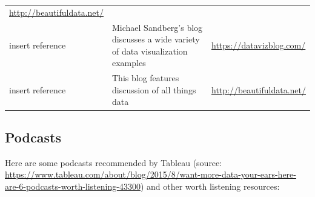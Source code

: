 \documentclass[]{book}
\begin{document}
\begin{longtable}[]{@{}lll@{}}
\begin{minipage}[t]{0.07\columnwidth}
\url{http://beautifuldata.net/}\strut
\end{minipage}\tabularnewline
\begin{minipage}[t]{0.07\columnwidth}\raggedright
insert reference\strut
\end{minipage} & \begin{minipage}[t]{0.77\columnwidth}\raggedright
Michael Sandberg's blog discusses a wide variety of data visualization examples\strut
\end{minipage} & \begin{minipage}[t]{0.07\columnwidth}\raggedright
\url{https://datavizblog.com/}\strut
\end{minipage}\tabularnewline
\begin{minipage}[t]{0.07\columnwidth}\raggedright
insert reference\strut
\end{minipage} & \begin{minipage}[t]{0.77\columnwidth}\raggedright
This blog features discussion of all things data\strut
\end{minipage} & \begin{minipage}[t]{0.07\columnwidth}\raggedright
\url{http://beautifuldata.net/}\strut
\end{minipage}\tabularnewline
\bottomrule
\end{longtable}

\hypertarget{podcasts}{%
\subsection{Podcasts}\label{podcasts}}

Here are some podcasts recommended by Tableau (source: \url{https://www.tableau.com/about/blog/2015/8/want-more-data-your-ears-here-are-6-podcasts-worth-listening-43300}) and other worth listening resources:
\end{document}
